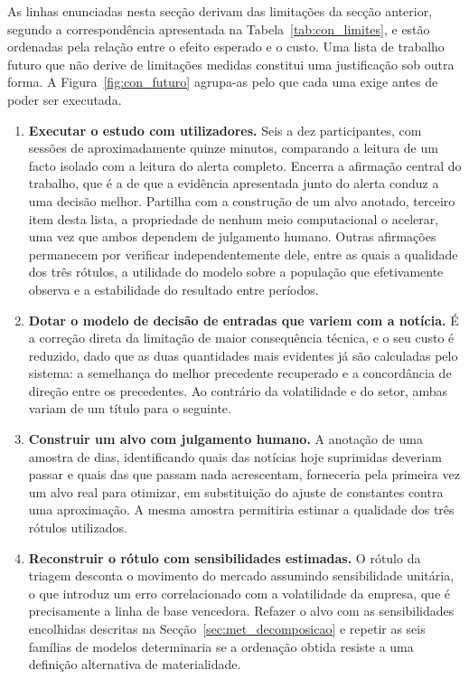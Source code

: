 As linhas enunciadas nesta secção derivam das limitações da secção anterior, segundo a
correspondência apresentada na Tabela~\ref{tab:con_limites}, e estão ordenadas pela relação entre o
efeito esperado e o custo. Uma lista de trabalho futuro que não derive de limitações medidas
constitui uma justificação sob outra forma. A Figura~\ref{fig:con_futuro} agrupa-as pelo que
cada uma exige antes de poder ser executada.

\begin{enumerate}
  \item \textbf{Executar o estudo com utilizadores.} Seis a dez participantes, com sessões de
        aproximadamente quinze minutos, comparando a leitura de um facto isolado com a leitura do
        alerta completo. Encerra a afirmação central do trabalho, que é a de que a evidência
        apresentada junto do alerta conduz a uma decisão melhor. Partilha com a construção de um
        alvo anotado, terceiro item desta lista, a propriedade de nenhum meio computacional o
        acelerar, uma vez que ambos dependem de julgamento humano. Outras afirmações permanecem
        por verificar independentemente dele, entre as quais a qualidade dos três rótulos, a
        utilidade do modelo sobre a população que efetivamente observa e a estabilidade do
        resultado entre períodos.
  \item \textbf{Dotar o modelo de decisão de entradas que variem com a notícia.} É a correção direta
        da limitação de maior consequência técnica, e o seu custo é reduzido, dado que as duas
        quantidades mais evidentes já são calculadas pelo sistema: a semelhança do melhor precedente
        recuperado e a concordância de direção entre os precedentes. Ao contrário da volatilidade e
        do setor, ambas variam de um título para o seguinte.

  \item \textbf{Construir um alvo com julgamento humano.} A anotação de uma amostra de dias,
        identificando quais das notícias hoje suprimidas deveriam passar e quais das que passam nada
        acrescentam, forneceria pela primeira vez um alvo real para otimizar, em substituição do
        ajuste de constantes contra uma aproximação. A mesma amostra permitiria estimar a qualidade
        dos três rótulos utilizados.

  \item \textbf{Reconstruir o rótulo com sensibilidades estimadas.} O rótulo da triagem desconta o
        movimento do mercado assumindo sensibilidade unitária, o que introduz um erro correlacionado
        com a volatilidade da empresa, que é precisamente a linha de base vencedora. Refazer o alvo
        com as sensibilidades encolhidas descritas na Secção~\ref{sec:met_decomposicao} e repetir as
        seis famílias de modelos determinaria se a ordenação obtida resiste a uma definição
        alternativa de materialidade.


\end{enumerate}
